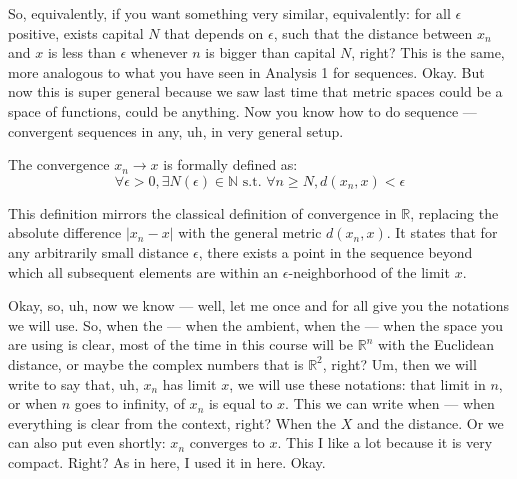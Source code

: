 \begin{spoken-clean}[00:05:15 - 00:06:23]
So, equivalently, if you want something very similar, equivalently: for all $\epsilon$ positive, exists capital $N$ that depends on $\epsilon$, such that the distance between $x_n$ and $x$ is less than $\epsilon$ whenever $n$ is bigger than capital $N$, right? This is the same, more analogous to what you have seen in Analysis 1 for sequences. Okay. But now this is super general because we saw last time that metric spaces could be a space of functions, could be anything. Now you know how to do sequence — convergent sequences in any, uh, in very general setup.
\end{spoken-clean}

\begin{math-stroke}
The convergence $x_n \to x$ is formally defined as:
\[ \forall \epsilon > 0, \exists N(\epsilon) \in \mathbb{N} \text{ s.t. } \forall n \ge N, d(x_n, x) < \epsilon \]

\begin{explanation-of-steps}
This definition mirrors the classical definition of convergence in $\mathbb{R}$, replacing the absolute difference $|x_n - x|$ with the general metric $d(x_n, x)$. It states that for any arbitrarily small distance $\epsilon$, there exists a point in the sequence beyond which all subsequent elements are  within an $\epsilon$-neighborhood of the limit $x$.
\end{explanation-of-steps}
\end{math-stroke}


\begin{spoken-clean}[00:06:23 - 00:07:38]
Okay, so, uh, now we know — well, let me once and for all give you the notations we will use. So, when the — when the ambient, when the — when the space you are using is clear, most of the time in this course will be $\mathbb{R}^n$ with the Euclidean distance, or maybe the complex numbers that is $\mathbb{R}^2$, right? Um, then we will write to say that, uh, $x_n$ has limit $x$, we will use these notations: that limit in $n$, or when $n$ goes to infinity, of $x_n$ is equal to $x$. This we can write when — when everything is clear from the context, right? When the $X$ and the distance. Or we can also put even shortly: $x_n$ converges to $x$. This I like a lot because it is very compact. Right? As in here, I used it in here. Okay.
\end{spoken-clean}

